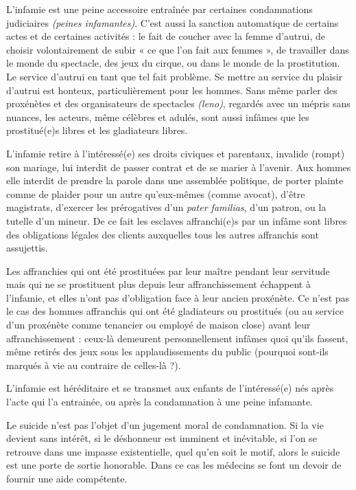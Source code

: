  L'infamie est une peine accessoire entraînée par certaines condamnations judiciaires \emph{(peines infamantes)}. C'est aussi la sanction automatique de certains actes et de certaines activités : le fait de coucher avec la femme d'autrui, de choisir volontairement de subir « ce que l'on fait aux femmes », de travailler dans le monde du spectacle, des jeux du cirque, ou dans le monde de la prostitution. Le service d'autrui en tant que tel fait problème. Se mettre au service du plaisir d'autrui est honteux, particulièrement pour les hommes. Sans même parler des proxénètes et des organisateurs de spectacles \emph{(leno)}, regardés avec un mépris sans nuances, les acteurs, même célèbres et adulés, sont aussi infâmes que les prostitué(e)s libres et les gladiateurs libres.

 L'infamie retire à l'intéressé(e) ses droits civiques et parentaux, invalide (rompt) son mariage, lui interdit de passer contrat et de se marier à l'avenir. Aux hommes elle interdit de prendre la parole dans une assemblée politique, de porter plainte comme de plaider pour un autre qu'eux-mêmes (comme avocat), d'être magistrats, d'exercer les prérogatives d'un \emph{pater familias}, d'un patron, ou la tutelle d'un mineur. De ce fait les esclaves affranchi(e)s par un infâme sont libres des obligations légales des clients auxquelles tous les autres affranchis sont assujettis.

 Les affranchies qui ont été prostituées par leur maître pendant leur servitude mais qui ne se prostituent plus depuis leur affranchissement échappent à l'infamie, et elles n'ont pas d'obligation face à leur ancien proxénète. Ce n'est pas le cas des hommes affranchis qui ont été gladiateurs ou prostitués (ou au service d'un proxénète comme tenancier ou employé de maison close) avant leur affranchissement : ceux-là demeurent personnellement infâmes quoi qu'ils fassent, même retirés des jeux sous les applaudissements du public (pourquoi sont-ils marqués à vie au contraire de celles-là ?). 

 L'infamie est héréditaire et se transmet aux enfants de l'intéressé(e) nés après l'acte qui l'a entrainée, ou après la condamnation à une peine infamante.

 Le suicide n'est pas l'objet d'un jugement moral de condamnation. Si la vie devient sans intérêt, si le déshonneur est imminent et inévitable, si l'on se retrouve dans une impasse existentielle, quel qu'en soit le motif, alors le suicide est une porte de sortie honorable. Dans ce cas les médecins se font un devoir de fournir une aide compétente. 


